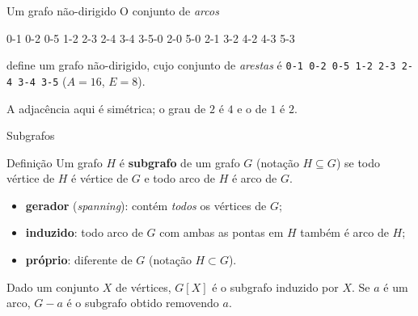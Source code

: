 \documentclass[aspectratio=169]{beamer}
\begin{document}
\begin{frame}{Um grafo não-dirigido}
  {\small O conjunto de \emph{arcos}}
  \begin{center}\ttfamily\scriptsize
    0-1 0-2 0-5 1-2 2-3 2-4 3-4 3-5-0 2-0 5-0 2-1 3-2 4-2 4-3 5-3
  \end{center}
  {\small define um grafo não-dirigido, cujo conjunto de \emph{arestas} é
  \texttt{0-1 0-2 0-5 1-2 2-3 2-4 3-4 3-5} ($A=16$, $E=8$).}
  \begin{center}
  \end{center}
  {\scriptsize A adjacência aqui é simétrica; o grau de $2$ é $4$ e o de $1$ é $2$.}
\end{frame}

\begin{frame}{Subgrafos}
  \begin{block}{Definição}
    {\small Um grafo $H$ é \textbf{subgrafo} de um grafo $G$ (notação
    $H \subseteq G$) se todo vértice de $H$ é vértice de $G$ e todo arco de $H$
    é arco de $G$.}
  \end{block}
  {\small
  \begin{itemize}\small
    \item \textbf{gerador} (\emph{spanning}): contém \emph{todos} os vértices de $G$;
    \item \textbf{induzido}: todo arco de $G$ com ambas as pontas em $H$ também é arco de $H$;
    \item \textbf{próprio}: diferente de $G$ (notação $H \subset G$).
  \end{itemize}

  \smallskip
  Dado um conjunto $X$ de vértices, $G[X]$ é o subgrafo induzido por $X$.
  Se $a$ é um arco, $G-a$ é o subgrafo obtido removendo $a$.}
\end{frame}
\end{document}
